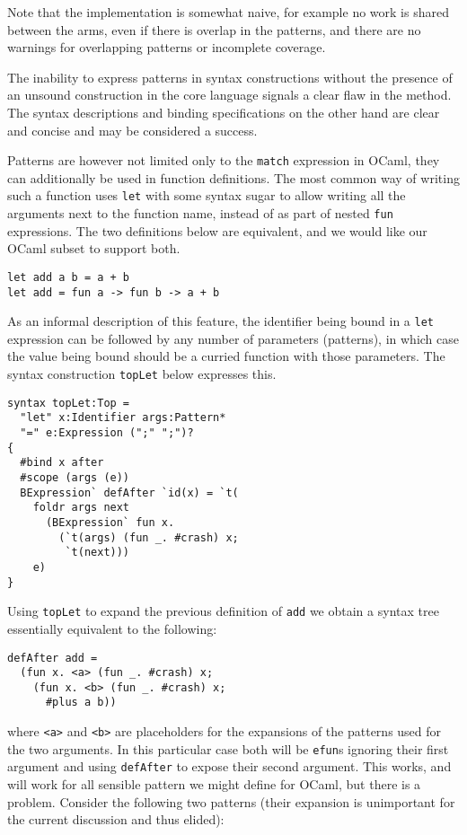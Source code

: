 \documentclass{kththesis}
\begin{document}
Note that the implementation is somewhat naive, for example no work is shared between the arms, even if there is overlap in the patterns, and there are no warnings for overlapping patterns or incomplete coverage.

The inability to express patterns in syntax constructions without the presence of an unsound construction in the core language signals a clear flaw in the method. The syntax descriptions and binding specifications on the other hand are clear and concise and may be considered a success.

Patterns are however not limited only to the \texttt{match} expression in OCaml, they can additionally be used in function definitions. The most common way of writing such a function uses \texttt{let} with some syntax sugar to allow writing all the arguments next to the function name, instead of as part of nested \texttt{fun} expressions. The two definitions below are equivalent, and we would like our OCaml subset to support both.

\begin{verbatim}
let add a b = a + b
let add = fun a -> fun b -> a + b
\end{verbatim}

As an informal description of this feature, the identifier being bound in a \texttt{let} expression can be followed by any number of parameters (patterns), in which case the value being bound should be a curried function with those parameters. The syntax construction \texttt{topLet} below expresses this.

\begin{verbatim}
syntax topLet:Top =
  "let" x:Identifier args:Pattern*
  "=" e:Expression (";" ";")?
{
  #bind x after
  #scope (args (e))
  BExpression` defAfter `id(x) = `t(
    foldr args next
      (BExpression` fun x.
        (`t(args) (fun _. #crash) x;
         `t(next)))
    e)
}
\end{verbatim}

Using \texttt{topLet} to expand the previous definition of \texttt{add} we obtain a syntax tree essentially equivalent to the following:

\begin{verbatim}
defAfter add =
  (fun x. <a> (fun _. #crash) x;
    (fun x. <b> (fun _. #crash) x;
      #plus a b))
\end{verbatim}

where \texttt{<a>} and \texttt{<b>} are placeholders for the expansions of the patterns used for the two arguments. In this particular case both will be \texttt{efun}s ignoring their first argument and using \texttt{defAfter} to expose their second argument. This works, and will work for all sensible pattern we might define for OCaml, but there is a problem. Consider the following two patterns (their expansion is unimportant for the current discussion and thus elided):
\end{document}

